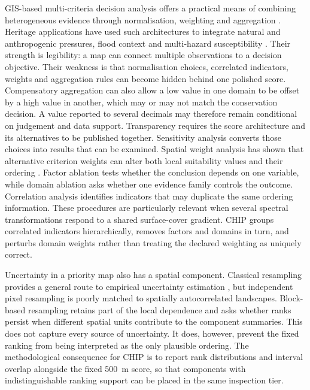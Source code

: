 GIS-based multi-criteria decision analysis offers a practical means of combining heterogeneous evidence through normalisation, weighting and aggregation \citep{malczewski2006gis}. Heritage applications have used such architectures to integrate natural and anthropogenic pressures, flood context and multi-hazard susceptibility \citep{hadjimitsis2013cyprus,guerriero2022derwent,yang2023yongtai}. Their strength is legibility: a map can connect multiple observations to a decision objective. Their weakness is that normalisation choices, correlated indicators, weights and aggregation rules can become hidden behind one polished score. Compensatory aggregation can also allow a low value in one domain to be offset by a high value in another, which may or may not match the conservation decision. A value reported to several decimals may therefore remain conditional on judgement and data support. Transparency requires the score architecture and its alternatives to be published together. Sensitivity analysis converts those choices into results that can be examined. Spatial weight analysis has shown that alternative criterion weights can alter both local suitability values and their ordering \citep{chen2010sensitivity,feizizadeh2014uncertainty}. Factor ablation tests whether the conclusion depends on one variable, while domain ablation asks whether one evidence family controls the outcome. Correlation analysis identifies indicators that may duplicate the same ordering information. These procedures are particularly relevant when several spectral transformations respond to a shared surface-cover gradient. CHIP groups correlated indicators hierarchically, removes factors and domains in turn, and perturbs domain weights rather than treating the declared weighting as uniquely correct.

Uncertainty in a priority map also has a spatial component. Classical resampling provides a general route to empirical uncertainty estimation \citep{efron1979bootstrap}, but independent pixel resampling is poorly matched to spatially autocorrelated landscapes. Block-based resampling retains part of the local dependence and asks whether ranks persist when different spatial units contribute to the component summaries. This does not capture every source of uncertainty. It does, however, prevent the fixed ranking from being interpreted as the only plausible ordering. The methodological consequence for CHIP is to report rank distributions and interval overlap alongside the fixed 500~m score, so that components with indistinguishable ranking support can be placed in the same inspection tier.

